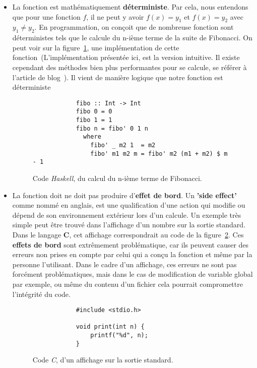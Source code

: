 \begin{itemize}
    \item[\textbullet] La fonction est mathématiquement 
    \textbf{déterministe}. Par cela, nous entendons que pour une fonction \(f\), 
    il ne peut y avoir \(f(x) = y_1\) et \(f(x) = y_2\) avec \(y_1 \neq y_2\). 
    En programmation, on conçoit que de nombreuse fonction 
    sont déterministes tels que le calcule du n-ième terme de la suite de 
    Fibonacci. On peut voir sur la figure~\ref{fig:progFiboHaskell}, une 
    implémentation de cette fonction~(L'implémentation présentée ici, est la 
    version intuitive. Il existe cependant des méthodes bien plus performantes 
    pour se calcule, se référer à l'article de blog~\cite{citationFiboProg}).
    Il vient de manière logique que notre fonction est déterministe
    \begin{figure}[H]
        \begin{verbatim}
            fibo :: Int -> Int
            fibo 0 = 0
            fibo 1 = 1
            fibo n = fibo' 0 1 n
              where
                fibo' _ m2 1  = m2
                fibo' m1 m2 m = fibo' m2 (m1 + m2) $ m - 1
        \end{verbatim}
        \caption{
            Code \textit{Haskell}, du calcul du n-ième terme de Fibonacci.
        }\label{fig:progFiboHaskell}
    \end{figure}

    \item[\textbullet] La fonction doit ne doit pas produire 
    d'\textbf{effet de bord}. Un \textbf{'side effect'} comme nommé en anglais, 
    est une qualification d'une action qui modifie ou dépend de son environnement 
    extérieur lors d'un calcule. Un exemple très simple peut être trouvé dans 
    l'affichage d'un nombre sur la sortie standard. Dans le langage \textbf{C},
    cet affichage correspondrait au code de la figure~\ref{fig:progAfficheC}.
    Ces \textbf{effets de bord} sont extrêmement problématique, car ils 
    peuvent causer des erreurs non prises en compte par celui qui a conçu la 
    fonction et même par la personne l'utilisant. Dans le cadre d'un affichage, 
    ces erreurs ne sont pas forcément problématiques, mais dans le cas de 
    modification de variable global par exemple, ou même du contenu d'un fichier
    cela pourrait compromettre l'intégrité du code.
    \begin{figure}[H]
        \begin{verbatim}
            #include <stdio.h>

            void print(int n) {
                printf("%d", n);
            }
        \end{verbatim}
        \caption{
            Code \textit{C}, d'un affichage sur la sortie standard.
        }\label{fig:progAfficheC}
    \end{figure}
\end{itemize}

